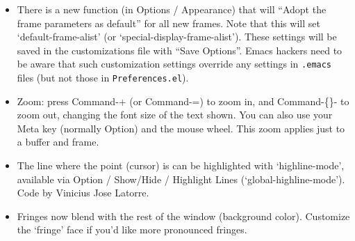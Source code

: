 \begin{itemize}
\item There is a new function (in Options / Appearance) that will ``Adopt the frame parameters as default'' for all new frames.  Note that this will set `default-frame-alist' (or `special-display-frame-alist'). These settings will be saved in the customizations file with ``Save Options''.  Emacs hackers need to be aware that such customization settings override any settings in {\tt .emacs} files (but not those in {\tt Preferences.el}).

\item Zoom: press Command-+ (or Command-=) to zoom in, and Command-\{\}- to zoom out, changing the font size of the text shown.   You can also use your Meta key (normally Option) and the mouse wheel.  This zoom applies just to a buffer and frame.

\item The line where the point (cursor) is can be highlighted with `highline-mode', available via Option / Show/Hide / Highlight Lines  (`global-highline-mode').
Code by Vinicius Jose Latorre.

\item Fringes now blend with the rest of the window (background color).  Customize the `fringe' face if you'd like more pronounced fringes.

\end{itemize}

